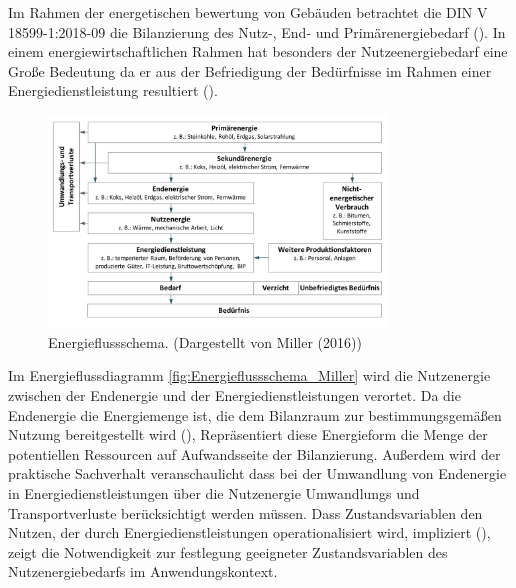 Im Rahmen der energetischen bewertung von Gebäuden betrachtet die DIN V 18599-1:2018-09 die Bilanzierung des Nutz-, End- und Primärenergiebedarf (\cite{DIN18599.2018}).
In einem energiewirtschaftlichen Rahmen hat besonders der Nutzeenergiebedarf eine Große Bedeutung da er aus der Befriedigung der Bedürfnisse im Rahmen einer 
Energiedienstleistung resultiert (\cite[S. 107]{Miller.2016}).

\begin{figure}[H]
    \centering
    \includegraphics[width=0.8\textwidth]{../../Ressourcen/Bilder/Energiefluss_Miller.jpg}
    \caption{Energieflussschema. (Dargestellt von Miller (2016))}
    \label{fig:Energieflussschema_Miller}
\end{figure}

Im Energieflussdiagramm \eqref{fig:Energieflussschema_Miller} wird die Nutzenergie zwischen der Endenergie und der Energiedienstleistungen verortet. 
Da die Endenergie die Energiemenge ist, die dem Bilanzraum zur bestimmungsgemäßen Nutzung bereitgestellt wird (\cite[Kapitel 3.1.2]{DIN18599.2018}), 
Repräsentiert diese Energieform die Menge der potentiellen Ressourcen auf Aufwandsseite der Bilanzierung.
Außerdem wird der praktische Sachverhalt veranschaulicht dass bei der Umwandlung von Endenergie in Energiedienstleistungen über die Nutzenergie 
Umwandlungs und Transportverluste berücksichtigt werden müssen.
Dass Zustandsvariablen den Nutzen, der durch Energiedienstleistungen operationalisiert wird, impliziert (\cite[S. 110]{Miller.2016}), zeigt die Notwendigkeit zur 
festlegung geeigneter Zustandsvariablen des Nutzenergiebedarfs im Anwendungskontext.

